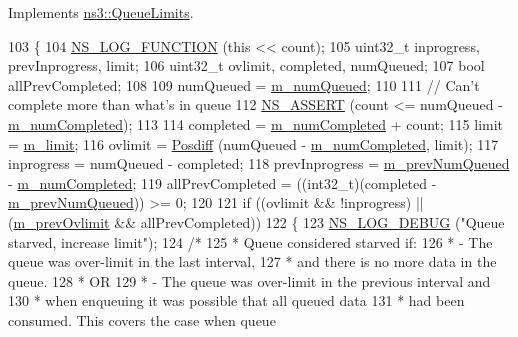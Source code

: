 Implements \hyperlink{classns3_1_1QueueLimits_adac8dd4e161b7b9e49f369852e90d0c0}{ns3\+::\+Queue\+Limits}.


\begin{DoxyCode}
103 \{
104   \hyperlink{log-macros-disabled_8h_a90b90d5bad1f39cb1b64923ea94c0761}{NS\_LOG\_FUNCTION} (\textcolor{keyword}{this} << count);
105   uint32\_t inprogress, prevInprogress, limit;
106   uint32\_t ovlimit, completed, numQueued;
107   \textcolor{keywordtype}{bool} allPrevCompleted;
108 
109   numQueued = \hyperlink{classns3_1_1DynamicQueueLimits_a5ac74a84c50fccf99c9580d21554146b}{m\_numQueued};
110 
111   \textcolor{comment}{// Can't complete more than what's in queue}
112   \hyperlink{assert_8h_a6dccdb0de9b252f60088ce281c49d052}{NS\_ASSERT} (count <= numQueued - \hyperlink{classns3_1_1DynamicQueueLimits_a324eecdc6e60e01387b707d64caa117c}{m\_numCompleted});
113 
114   completed = \hyperlink{classns3_1_1DynamicQueueLimits_a324eecdc6e60e01387b707d64caa117c}{m\_numCompleted} + count;
115   limit = \hyperlink{classns3_1_1DynamicQueueLimits_ace85f564a3f7b4aadfed9dc7df775579}{m\_limit};
116   ovlimit = \hyperlink{classns3_1_1DynamicQueueLimits_ab4177a222243fb17528c5dfeb1f6c7da}{Posdiff} (numQueued - \hyperlink{classns3_1_1DynamicQueueLimits_a324eecdc6e60e01387b707d64caa117c}{m\_numCompleted}, limit);
117   inprogress = numQueued - completed;
118   prevInprogress = \hyperlink{classns3_1_1DynamicQueueLimits_a88d80e7cd24b67993d9416ff0c7fd75d}{m\_prevNumQueued} - \hyperlink{classns3_1_1DynamicQueueLimits_a324eecdc6e60e01387b707d64caa117c}{m\_numCompleted};
119   allPrevCompleted = ((int32\_t)(completed - \hyperlink{classns3_1_1DynamicQueueLimits_a88d80e7cd24b67993d9416ff0c7fd75d}{m\_prevNumQueued})) >= 0;
120 
121   \textcolor{keywordflow}{if} ((ovlimit && !inprogress) || (\hyperlink{classns3_1_1DynamicQueueLimits_a63d5c451bd659754d9968445e5c3a1b9}{m\_prevOvlimit} && allPrevCompleted))
122     \{
123       \hyperlink{group__logging_ga413f1886406d49f59a6a0a89b77b4d0a}{NS\_LOG\_DEBUG} (\textcolor{stringliteral}{"Queue starved, increase limit"});
124      \textcolor{comment}{/*}
125 \textcolor{comment}{      * Queue considered starved if:}
126 \textcolor{comment}{      *   - The queue was over-limit in the last interval,}
127 \textcolor{comment}{      *     and there is no more data in the queue.}
128 \textcolor{comment}{      *  OR}
129 \textcolor{comment}{      *   - The queue was over-limit in the previous interval and}
130 \textcolor{comment}{      *     when enqueuing it was possible that all queued data}
131 \textcolor{comment}{      *     had been consumed.  This covers the case when queue}

\end{DoxyCode}

